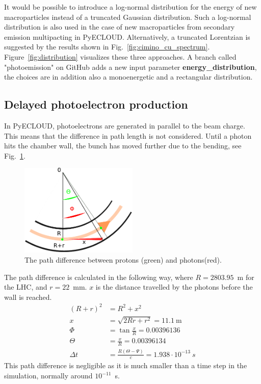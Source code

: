 It would be possible to introduce a log-normal distribution for the energy of new macroparticles instead of a truncated Gaussian distribution.
Such a log-normal distribution is also used in the case of new macroparticles from secondary emission multipacting in PyECLOUD.
Alternatively, a truncated Lorentzian is suggested by the results shown in Fig.~\ref{fig:cimino_cu_spectrum}.
Figure~\ref{fig:distribution} visualizes these three approaches.
A branch called "photoemission" on GitHub adds a new input parameter \textbf{energy\_distribution}, the choices are in addition also a monoenergetic and a rectangular distribution.

\subsection{Delayed photoelectron production}

In PyECLOUD, photoelectrons are generated in parallel to the beam charge.
This means that the difference in path length is not considered.
Until a photon hits the chamber wall, the bunch has moved further due to the bending, see Fig.~\ref{fig:drawing}.
\begin{figure}[tbh]
    \centering
    \includegraphics[width=0.5\textwidth]{../scripts/drawing.pdf}
    \caption{The path difference between protons (green) and photons(red).}
    \label{fig:drawing}
\end{figure}
The path difference is calculated in the following way, where $R=2803.95$~m for the LHC, and $r=22$~mm.
$x$ is the distance travelled by the photons before the wall is reached.
\begin{align}
    (R+r)^2 &= R^2 + x^2
    \\
    x &= \sqrt{2Rr + r^2} = 11.1~\text{m}
    \\
    \Phi &= \tan\frac{x}{R} = 0.00396136
    \\
    \Theta &= \frac{x}{R} = 0.00396134
    \\
    \Delta t &= \frac{R(\Theta - \Psi)}{c} = 1.938\cdot10^{-13}~s
\end{align}
This path difference is negligible as it is much smaller than a time step in the simulation, normally around $10^{-11}$~s.

